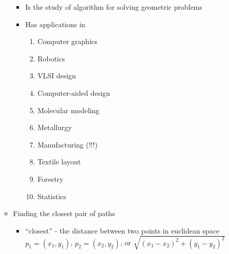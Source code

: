 \documentclass[12pt]{article}
\begin{document}
\begin{enumerate}[1.]
\begin{itemize}
        \begin{itemize}
            \item Is the study of algorithm for solving geometric problems
            \item Has applications in

            \begin{enumerate}[1.]
                \item Computer graphics
                \item Robotics
                \item VLSI design
                \item Computer-aided design
                \item Molecular modeling
                \item Metallurgy
                \item Manufacturing (!!!)
                \item Textile layout
                \item Forestry
                \item Statistics
            \end{enumerate}
        \end{itemize}

        \item Finding the closest pair of paths

        \begin{itemize}
            \item ``closest'' - the distance between two points in euclidean space $p_1 = (x_1, y_1)$, $p_2 = (x_2, y_2)$, or
            $\sqrt{(x_1 - x_2)^2 + (y_1 - y_2)^2}$
        \end{itemize}
    \end{itemize}


\end{enumerate}
\end{document}
